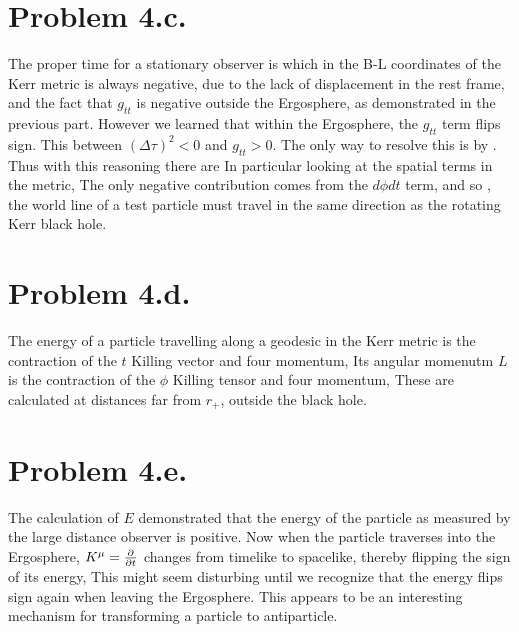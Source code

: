 \documentclass{article}
\begin{document}
\section*{Problem 4.c.}
The proper time for a stationary observer is
which in the B-L coordinates of the Kerr metric is always negative, due to the lack of displacement in the rest frame, and the fact that $g_{tt}$ is negative outside the Ergosphere, as demonstrated in the previous part. However we learned that within the Ergosphere,
the $g_{tt}$ term flips sign. This  between $(\Delta \tau)^2<0$ and $g_{tt}>0$. The only way to resolve this is by . Thus with this reasoning there are  In particular looking at the spatial terms in the metric,
The only negative contribution comes from the $d\phi dt$ term, and so , the world line of a test particle must travel in the same direction as the rotating Kerr black hole.
\section*{Problem 4.d.}
The energy of a particle travelling along a geodesic in the Kerr metric is the contraction of the $t$ Killing vector and four momentum,
Its angular momenutm $L$ is the contraction of the $\phi$ Killing tensor and four momentum,
These are calculated at distances far from $r_+$, outside the black hole.
\section*{Problem 4.e.}
The calculation of $E$ demonstrated that the energy of the particle as measured by the large distance observer is positive. Now when the particle traverses into the Ergosphere, $K^\mu=\frac{\partial}{\partial t}$ changes from timelike to spacelike, thereby flipping the sign of its energy,
This might seem disturbing until we recognize that the energy flips sign again when leaving the Ergosphere. This appears to be an interesting mechanism for transforming a particle to antiparticle.
\end{document}
